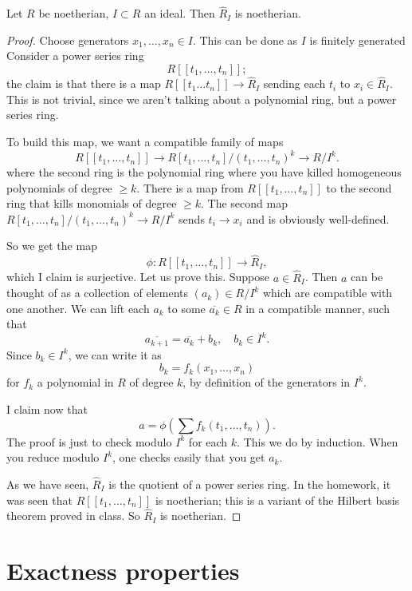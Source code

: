 \begin{proposition} 
Let $R$ be noetherian, $I \subset R$ an ideal. Then $\hat{R}_I$ is noetherian.
\end{proposition} 
\begin{proof} 
Choose generators $x_1, \dots, x_n \in I$. This can be done as $I$ is finitely generated
Consider a power series ring 
\[ R[[t_1, \dots, t_n]] ; \]
the claim is that there is a map $R[[t_1\dots t_n]] \to \hat{R}_I$ sending each
$t_i$ to $x_i  \in \hat{R}_I$. This is not trivial, since we aren't talking
about a polynomial ring, but a power series ring. 

To build this map, we  want a compatible family of maps
\[ R[[t_1, \dots, t_n]] \to R[t_1, \dots, t_n]/(t_1, \dots, t_n)^k  \to R/I^k.  \]
where the second ring is the polynomial ring where you have killed homogeneous
polynomials of degree $\geq k$. There is a map from $R[[t_1, \dots, t_n]]$ to
the second ring that kills monomials of degree $ \geq k$. The second map
$R[t_1, \dots, t_n]/(t_1, \dots, t_n)^k \to R/I^k$ sends $t_i \to x_i$ and is
obviously well-defined.

So we get the map
\[ \phi:  R[[t_1, \dots, t_n]] \to \hat{R}_I ,  \]
which I claim is surjective. Let us prove this. Suppose $a \in \hat{R}_I$. Then $a$ can be thought
of as a collection of elements $(a_k) \in R/I^k$ which are compatible with one
another.  We can lift each $a_k$ to some $\overline{a_k} \in R$ in a
compatible manner, such that
\[ \overline{a_{k+1}} = \overline{a_k} + b_k, \quad b_k \in I^k.  \]
Since $b_k \in I^k$, we can write it as
\[ b_k = f_k(x_1, \dots, x_n)  \]
for $f_k$ a polynomial in $R$ of degree $k$, by definition of the generators in
$I^k$. 

I claim now that 
\[ a = \phi\left( \sum f_k(t_1, \dots, t_n)  \right).  \]
The proof is just to check modulo $I^k$ for each $k$. This we  do by induction.
When you reduce  modulo $I^k$, one checks easily that you get $a_k$.

As we have seen, $\hat{R}_I$ is the quotient of a power series ring. In the
homework, it was seen that $R[[t_1, \dots, t_n]]$ is noetherian; this is a
variant of the Hilbert basis theorem proved in class. So $\hat{R}_I$ is
noetherian.
\end{proof} 


\section{Exactness properties}

